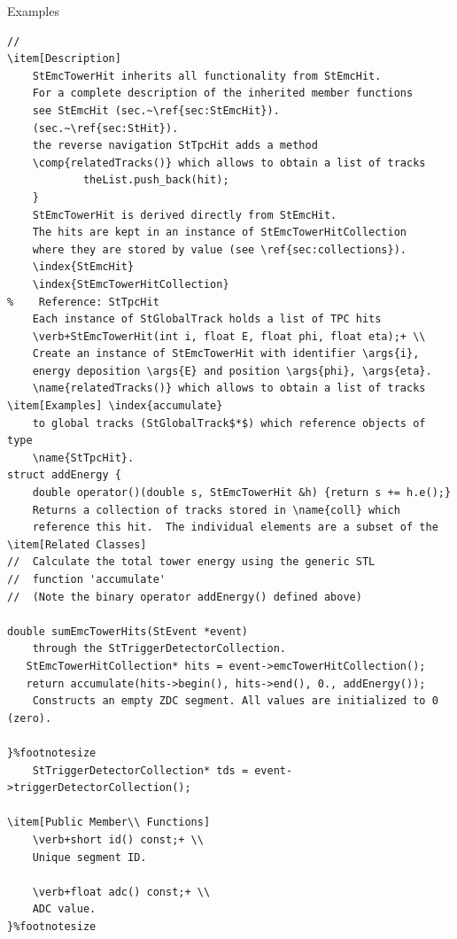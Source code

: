 \begin{Entry}
\begin{Entry}
\item[Examples]
{\footnotesize
\begin{verbatim}
//
\item[Description]
    StEmcTowerHit inherits all functionality from StEmcHit.
    For a complete description of the inherited member functions
    see StEmcHit (sec.~\ref{sec:StEmcHit}).
    (sec.~\ref{sec:StHit}).
    the reverse navigation StTpcHit adds a method
    \comp{relatedTracks()} which allows to obtain a list of tracks
            theList.push_back(hit);
    }
    StEmcTowerHit is derived directly from StEmcHit.
    The hits are kept in an instance of StEmcTowerHitCollection
    where they are stored by value (see \ref{sec:collections}).
    \index{StEmcHit}
    \index{StEmcTowerHitCollection}
%    Reference: StTpcHit
    Each instance of StGlobalTrack holds a list of TPC hits
    \verb+StEmcTowerHit(int i, float E, float phi, float eta);+ \\
    Create an instance of StEmcTowerHit with identifier \args{i},
    energy deposition \args{E} and position \args{phi}, \args{eta}.
    \name{relatedTracks()} which allows to obtain a list of tracks
\item[Examples] \index{accumulate} 
    to global tracks (StGlobalTrack$*$) which reference objects of type
    \name{StTpcHit}.
struct addEnergy {
    double operator()(double s, StEmcTowerHit &h) {return s += h.e();}
    Returns a collection of tracks stored in \name{coll} which
    reference this hit.  The individual elements are a subset of the
\item[Related Classes]
//  Calculate the total tower energy using the generic STL
//  function 'accumulate'
//  (Note the binary operator addEnergy() defined above)
    
double sumEmcTowerHits(StEvent *event)
    through the StTriggerDetectorCollection.
   StEmcTowerHitCollection* hits = event->emcTowerHitCollection();
   return accumulate(hits->begin(), hits->end(), 0., addEnergy());
    Constructs an empty ZDC segment. All values are initialized to 0 (zero).

}%footnotesize
    StTriggerDetectorCollection* tds = event->triggerDetectorCollection();

\item[Public Member\\ Functions]
    \verb+short id() const;+ \\
    Unique segment ID.

    \verb+float adc() const;+ \\
    ADC value.
}%footnotesize    
    

\end{verbatim}}
\end{Entry}
\end{Entry}
